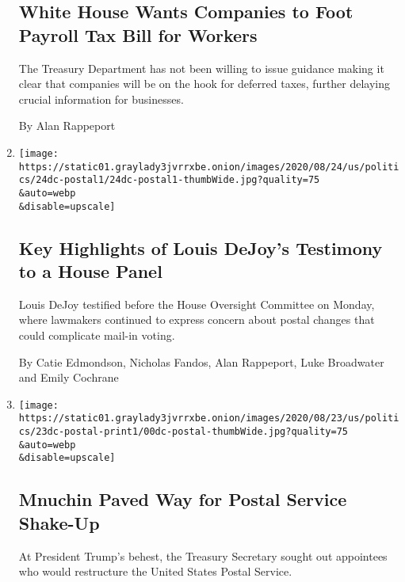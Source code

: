 \begin{enumerate}
{  \subsection{White House Wants Companies to Foot Payroll Tax Bill for
  Workers}\label{white-house-wants-companies-to-foot-payroll-tax-bill-for-workers}}

  The Treasury Department has not been willing to issue guidance making
  it clear that companies will be on the hook for deferred taxes,
  further delaying crucial information for businesses.

  By Alan Rappeport
\item
  \href{/2020/08/24/us/politics/postal-service-dejoy-testimony.html}{}

  \texttt{[image: https://static01.graylady3jvrrxbe.onion/images/2020/08/24/us/politics/24dc-postal1/24dc-postal1-thumbWide.jpg?quality=75\\\&auto=webp\\\&disable=upscale]}

  \hypertarget{key-highlights-of-louis-dejoys-testimony-to-a-house-panel}{%
  \subsection{Key Highlights of Louis DeJoy's Testimony to a House
  Panel}\label{key-highlights-of-louis-dejoys-testimony-to-a-house-panel}}

  Louis DeJoy testified before the House Oversight Committee on Monday,
  where lawmakers continued to express concern about postal changes that
  could complicate mail-in voting.

  By Catie Edmondson, Nicholas Fandos, Alan Rappeport, Luke Broadwater
  and Emily Cochrane
\item
  \href{/2020/08/22/business/economy/dejoy-postmaster-general-trump-mnuchin.html}{}

  \texttt{[image: https://static01.graylady3jvrrxbe.onion/images/2020/08/23/us/politics/23dc-postal-print1/00dc-postal-thumbWide.jpg?quality=75\\\&auto=webp\\\&disable=upscale]}

  \hypertarget{mnuchin-paved-way-for-postal-service-shake-up}{%
  \subsection{Mnuchin Paved Way for Postal Service
  Shake-Up}\label{mnuchin-paved-way-for-postal-service-shake-up}}

  At President Trump's behest, the Treasury Secretary sought out
  appointees who would restructure the United States Postal Service.


\end{enumerate}
